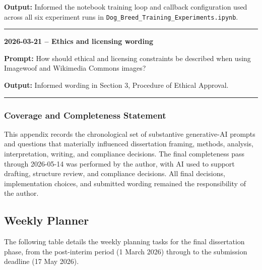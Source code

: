 \documentclass[12pt, a4paper]{article}
\begin{document}
\textbf{Output:} Informed the notebook training loop and callback configuration used across all six experiment runs in \texttt{Dog\_Breed\_Training\_Experiments.ipynb}.

\vspace{0.4cm}
\noindent\rule{\textwidth}{0.4pt}

\textbf{2026-03-21 -- Ethics and licensing wording}

\textbf{Prompt:} How should ethical and licensing constraints be described when using Imagewoof and Wikimedia Commons images?

\textbf{Output:} Informed wording in Section 3, Procedure of Ethical Approval.

\vspace{0.4cm}
\noindent\rule{\textwidth}{0.4pt}


\subsubsection{Coverage and Completeness Statement}

This appendix records the chronological set of substantive generative-AI prompts and questions that materially influenced dissertation framing, methods, analysis, interpretation, writing, and compliance decisions. The final completeness pass through 2026-05-14 was performed by the author, with AI used to support drafting, structure review, and compliance decisions. All final decisions, implementation choices, and submitted wording remained the responsibility of the author.

\subsection{Weekly Planner}

The following table details the weekly planning tasks for the final dissertation phase, from the post-interim period (1 March 2026) through to the submission deadline (17 May 2026).
\end{document}

